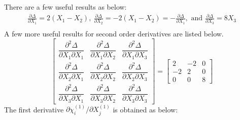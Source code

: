 \documentclass[12pt]{amsart}
\begin{document}
There are a few useful results as below:
\begin{equation}
  \label{eq:princ2}
  \begin{split}
    \frac{\partial\Delta}{\partial X_1}=2(X_1-X_2),\ \frac{\partial\Delta}{\partial X_2}=-2(X_1-X_2)=-\frac{\partial\Delta}{\partial X_1},\text{ and } \frac{\partial\Delta}{\partial X_3}=8X_3\\
  \end{split}
\end{equation}
A few more useful results for second order derivatives are listed below.
\begin{equation}
  \label{eq:princ3}
  \begin{bmatrix}
    \dfrac{\partial^2\Delta}{\partial X_1 \partial X_1} & \dfrac{\partial^2\Delta}{\partial X_1 \partial X_2} & \dfrac{\partial^2\Delta}{\partial X_1 \partial X_3} \\
    \dfrac{\partial^2\Delta}{\partial X_2 \partial X_1} & \dfrac{\partial^2\Delta}{\partial X_2 \partial X_2} & \dfrac{\partial^2\Delta}{\partial X_2 \partial X_3} \\
    \dfrac{\partial^2\Delta}{\partial X_3 \partial X_1} & \dfrac{\partial^2\Delta}{\partial X_3 \partial X_2} & \dfrac{\partial^2\Delta}{\partial X_3 \partial X_3}
  \end{bmatrix}
  =
  \begin{bmatrix}
    2& -2& 0\\
   -2&  2& 0\\
    0&  0& 8
  \end{bmatrix}
\end{equation}
The first derivative $\partial\chi^{(1)}_i/\partial X^{(1)}_j$  is obtained as below:
\end{document}
